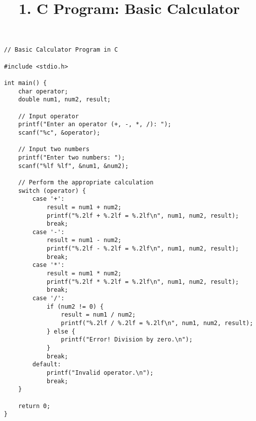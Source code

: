 \documentclass{article}
\begin{document}
\title{1. C Program: Basic Calculator}
\author{}
\date{}
\maketitle

\begin{lstlisting}
// Basic Calculator Program in C

#include <stdio.h>

int main() {
    char operator;
    double num1, num2, result;

    // Input operator
    printf("Enter an operator (+, -, *, /): ");
    scanf("%c", &operator);

    // Input two numbers
    printf("Enter two numbers: ");
    scanf("%lf %lf", &num1, &num2);

    // Perform the appropriate calculation
    switch (operator) {
        case '+':
            result = num1 + num2;
            printf("%.2lf + %.2lf = %.2lf\n", num1, num2, result);
            break;
        case '-':
            result = num1 - num2;
            printf("%.2lf - %.2lf = %.2lf\n", num1, num2, result);
            break;
        case '*':
            result = num1 * num2;
            printf("%.2lf * %.2lf = %.2lf\n", num1, num2, result);
            break;
        case '/':
            if (num2 != 0) {
                result = num1 / num2;
                printf("%.2lf / %.2lf = %.2lf\n", num1, num2, result);
            } else {
                printf("Error! Division by zero.\n");
            }
            break;
        default:
            printf("Invalid operator.\n");
            break;
    }

    return 0;
}
\end{lstlisting}
\end{document}
